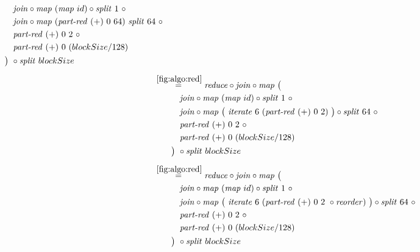\begin{align*}
\begin{aligned}
    &\qquad\quad\join \circ \map\ (\map\ id) \circ \splitN\ 1\ \circ\\
    &\qquad\quad\join \circ \map\ (\partRed\ (+)\ 0\ 64)\ \splitN\ 64\ \circ\\
    &\qquad\quad\partRed\ (+)\ 0\ 2\ \circ \\
    &\qquad\quad\partRed\ (+)\ 0\ (blockSize/128)\\
    &\qquad\big)\ \circ \splitN\ blockSize
  \end{aligned}\\[.5em]
%
  &\hspace{-2em}\quad\begin{aligned}
    &\overset{\ref{fig:algo:red}}{=\hspace{.2em}}
      \reduce \circ \join \circ \map\ \big(\\
    &\qquad\quad\join \circ \map\ (\map\ id) \circ \splitN\ 1\ \circ\\
    &\qquad\quad\join \circ \map\ \big(\ \iterateN\ 6\ (\partRed\ (+)\ 0\ 2)\ \big)\circ \splitN\ 64\ \circ\\
    &\qquad\quad\partRed\ (+)\ 0\ 2\ \circ \\
    &\qquad\quad\partRed\ (+)\ 0\ (blockSize/128)\\
    &\qquad\big)\ \circ \splitN\ blockSize
  \end{aligned}\\[.5em]
%
  &\hspace{-2em}\quad\begin{aligned}
    &\overset{\ref{fig:algo:red}}{=\hspace{.2em}}
      \reduce \circ \join \circ \map\ \big(\\
    &\qquad\quad\join \circ \map\ (\map\ id) \circ \splitN\ 1\ \circ\\
    &\qquad\quad\join \circ \map\ \big(\ \iterateN\ 6\ (\partRed\ (+)\ 0\ 2\ \circ \reorder)\ \big)\circ \splitN\ 64\ \circ\\
    &\qquad\quad\partRed\ (+)\ 0\ 2\ \circ \\
    &\qquad\quad\partRed\ (+)\ 0\ (blockSize/128)\\
    &\qquad\big)\ \circ \splitN\ blockSize
  \end{aligned}\\[.5em]
%
\end{align*}

